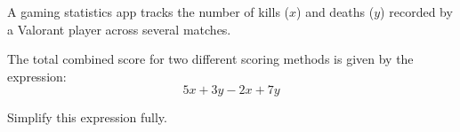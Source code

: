 \begin{question}
\noindent A gaming statistics app tracks the number of kills ($x$) and deaths ($y$) recorded by a Valorant player across several matches.

The total combined score for two different scoring methods is given by the expression:
\[
5x + 3y - 2x + 7y
\]

Simplify this expression fully.
\vspace{4cm}
\begin{flushright}
\end{flushright}
\end{question}
